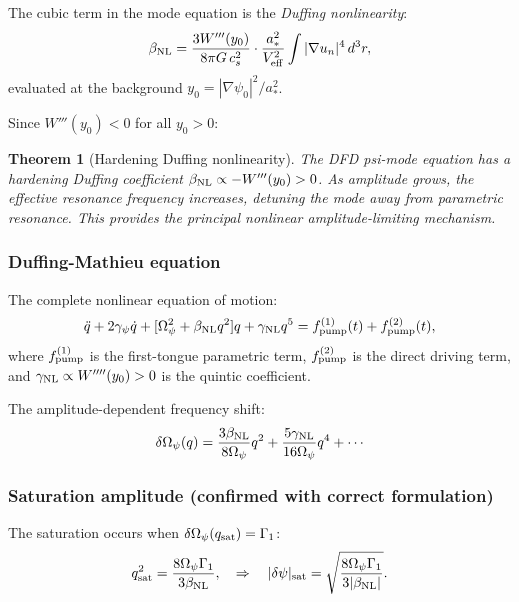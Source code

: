 \documentclass[11pt,twocolumn]{article}
\newcommand{\dpsi}{\delta\psi}
\newcommand{\Opsi}{\Omega_\psi}
\newcommand{\gpsi}{\gamma_\psi}
\newcommand{\astar}{a_*}
\newtheorem{theorem}{Theorem}
\begin{document}
The cubic term in the mode equation is the \emph{Duffing nonlinearity}:
\begin{equation}
\beta_{\rm NL} = \frac{3 W'''(y_0)}{8\pi G\,c_s^2}
\cdot\frac{\astar^2}{V_{\rm eff}^2}\int|\nabla u_n|^4\,d^3r,
\label{eq:beta_NL}
\end{equation}
evaluated at the background $y_0 = |\nabla\psi_0|^2/\astar^2$.

Since $W'''(y_0) < 0$ for all $y_0 > 0$:

\begin{theorem}[Hardening Duffing nonlinearity]
\label{thm:hardening}
The DFD psi-mode equation has a \emph{hardening} Duffing coefficient
$\beta_{\rm NL} \propto -W'''(y_0) > 0$. As amplitude grows, the
effective resonance frequency increases, detuning the mode \emph{away}
from parametric resonance. This provides the principal nonlinear
amplitude-limiting mechanism.
\end{theorem}

\subsubsection{Duffing-Mathieu equation}

The complete nonlinear equation of motion:
\begin{equation}
\ddot{q} + 2\gpsi\dot{q} + [\Opsi^2 + \beta_{\rm NL} q^2] q
+ \gamma_{\rm NL} q^5
= f_{\rm pump}^{(1)}(t) + f_{\rm pump}^{(2)}(t),
\label{eq:duffing_mathieu}
\end{equation}
where $f_{\rm pump}^{(1)}$ is the first-tongue parametric term,
$f_{\rm pump}^{(2)}$ is the direct driving term, and $\gamma_{\rm NL}
\propto W''''(y_0) > 0$ is the quintic coefficient.

The amplitude-dependent frequency shift:
\begin{equation}
\delta\Opsi(q) = \frac{3\beta_{\rm NL}}{8\Opsi}q^2 + \frac{5\gamma_{\rm NL}}{16\Opsi}q^4 + \cdots
\label{eq:freq_shift}
\end{equation}

\subsubsection{Saturation amplitude (confirmed with correct formulation)}

The saturation occurs when $\delta\Opsi(q_{\rm sat}) = \Gamma_1$:
\begin{equation}
q_{\rm sat}^2 = \frac{8\Opsi\Gamma_1}{3\beta_{\rm NL}},
\quad\Rightarrow\quad
|\dpsi|_{\rm sat} = \sqrt{\frac{8\Opsi\Gamma_1}{3|\beta_{\rm NL}|}}.
\label{eq:q_sat}
\end{equation}
\end{document}

